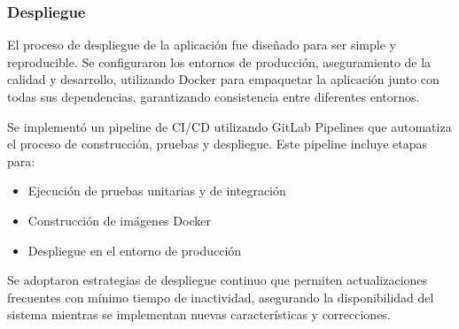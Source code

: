 \subsubsection{Despliegue}
El proceso de despliegue de la aplicación fue diseñado para ser simple y reproducible. Se configuraron los entornos de producción, aseguramiento de la calidad y desarrollo, utilizando Docker para empaquetar la aplicación junto con todas sus dependencias, garantizando consistencia entre diferentes entornos.

Se implementó un pipeline de CI/CD utilizando GitLab Pipelines que automatiza el proceso de construcción, pruebas y despliegue. Este pipeline incluye etapas para:
\begin{itemize}
    \item Ejecución de pruebas unitarias y de integración
    \item Construcción de imágenes Docker
    \item Despliegue en el entorno de producción
\end{itemize}

Se adoptaron estrategias de despliegue continuo que permiten actualizaciones frecuentes con mínimo tiempo de inactividad, asegurando la disponibilidad del sistema mientras se implementan nuevas características y correcciones.
